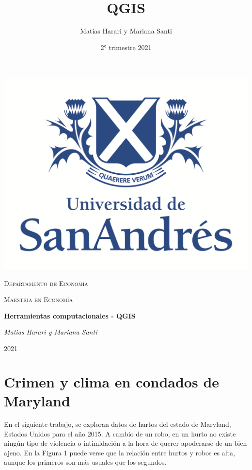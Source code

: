 \documentclass[10.5pt]{article}   %
\title{QGIS}
\author{Matías Harari y Mariana Santi}
\date{2° trimestre 2021}
\begin{document}
\renewcommand{\thesubsection}{\thesection.\alph{subsection}}

\thispagestyle{empty}
\setlength\headheight{0pt} 
\begin{center}

\begin{center}
\includegraphics[width=0.65\linewidth]{imgs/logoudesa.png}            
\end{center}	

        \vspace{0.2cm}
        {\scshape\LARGE Departamento de Economía \par}
        \vspace{0.2cm}
        {\scshape\Large Maestría en Economía\par}
        \vspace{0.4cm}

        {\Large\bfseries Herramientas computacionales - QGIS\par}
        
        \vspace{1cm}
        {\Large\itshape Matias Harari y Mariana Santi \par}


\vspace{1cm} 
\large
{2021}

\end{center}

\clearpage
\justify




\section*{Crimen y clima en condados de Maryland}

En el siguiente trabajo, se exploran datos de hurtos del estado de Maryland, Estados Unidos para el año 2015. A cambio de un robo, en un hurto no existe ningún tipo de violencia o intimidación a la hora de querer apoderarse de un bien ajeno. En la Figura 1 puede verse que la relación entre hurtos y robos es alta, aunque los primeros son más usuales que los segundos.
\end{document}
